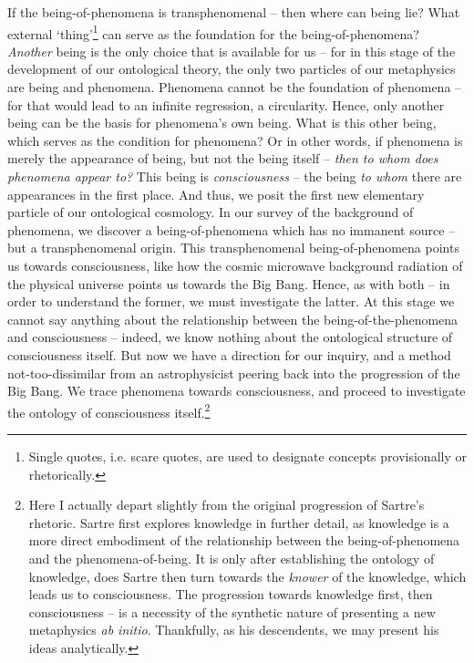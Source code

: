 
If the being-of-phenomena is transphenomenal -- then where can being lie? What external \enquote*{thing}\footnote{Single quotes, i.e. scare quotes, are used to designate concepts provisionally or rhetorically.} can serve as the foundation for the being-of-phenomena? \emph{Another} being is the only choice that is available for us -- for in this stage of the development of our ontological theory, the only two particles of our metaphysics are being and phenomena. Phenomena cannot be the foundation of phenomena -- for that would lead to an infinite regression, a circularity. Hence, only another being can be the basis for phenomena's own being. What is this other being, which serves as the condition for phenomena? Or in other words, if phenomena is merely the appearance of being, but not the being itself -- \emph{then to whom does phenomena appear to?} This being is \emph{consciousness} -- the being \emph{to whom} there are appearances in the first place. And thus, we posit the first new elementary particle of our ontological cosmology. In our survey of the background of phenomena, we discover a being-of-phenomena which has no immanent source -- but a transphenomenal origin. This transphenomenal being-of-phenomena points us towards consciousness, like how the cosmic microwave background radiation of the physical universe points us towards the Big Bang. Hence, as with both -- in order to understand the former, we must investigate the latter. At this stage we cannot say anything about the relationship between the being-of-the-phenomena and consciousness -- indeed, we know nothing about the ontological structure of consciousness itself. But now we have a direction for our inquiry, and a method not-too-dissimilar from an astrophysicist peering back into the progression of the Big Bang. We trace phenomena towards consciousness, and proceed to investigate the ontology of consciousness itself.\footnote{Here I actually depart slightly from the original progression of Sartre's rhetoric. Sartre first explores knowledge in further detail, as knowledge is a more direct embodiment of the relationship between the being-of-phenomena and the phenomena-of-being. It is only after establishing the ontology of knowledge, does Sartre then turn towards the \emph{knower} of the knowledge, which leads us to consciousness. The progression towards knowledge first, then consciousness -- is a necessity of the synthetic nature of presenting a new metaphysics \emph{ab initio}. Thankfully, as his descendents, we may present his ideas analytically.}

